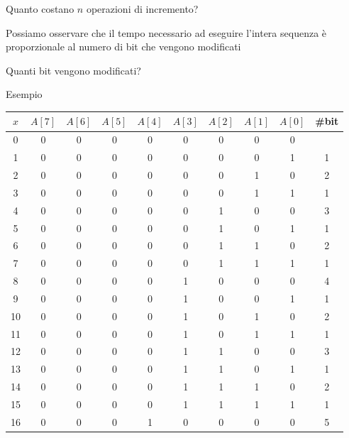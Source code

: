 \begin{frame}{Quanto costano $n$ operazioni di incremento?}

\vspace{-9pt}
\begin{myboxtitle}
\BI
\item Possiamo osservare che il tempo necessario ad eseguire l’intera sequenza è proporzionale al numero di bit che vengono modificati
\item Quanti bit vengono modificati?
\EI
\end{myboxtitle}

\end{frame}

\begin{frame}{Esempio}
	
\vspace{-6pt}
\small
\begin{tabular}{ccccccccc|c}
 $x$  &  $A[7]$ & $A[6]$ & $A[5]$ & $A[4]$ & $A[3]$ & $A[2]$ & $A[1]$ & $A[0]$ & \#bit \\\hline
 0 & 0 & 0 & 0 & 0 & 0 & 0 & 0 & 0 \\
 1 & 0 & 0 & 0 & 0 & 0 & 0 & 0 & \alert{1} & 1 \\
 2 & 0 & 0 & 0 & 0 & 0 & 0 & \alert{1} & \alert{0} & 2 \\
 3 & 0 & 0 & 0 & 0 & 0 & 0 & 1 & \alert{1} & 1 \\
 4 & 0 & 0 & 0 & 0 & 0 & \alert{1} & \alert{0} & \alert{0} & 3 \\
 5 & 0 & 0 & 0 & 0 & 0 & 1 & 0 & \alert{1} & 1 \\
 6 & 0 & 0 & 0 & 0 & 0 & 1 & \alert{1} & \alert{0} & 2 \\
 7 & 0 & 0 & 0 & 0 & 0 & 1 & 1 & \alert{1} & 1 \\
 8 & 0 & 0 & 0 & 0 & \alert{1} & \alert{0} & \alert{0} & \alert{0} & 4 \\
 9 & 0 & 0 & 0 & 0 & 1 & 0 & 0 & \alert{1} & 1 \\
10 & 0 & 0 & 0 & 0 & 1 & 0 & \alert{1} & \alert{0} & 2 \\
11 & 0 & 0 & 0 & 0 & 1 & 0 & 1 & \alert{1} & 1 \\
12 & 0 & 0 & 0 & 0 & 1 & \alert{1} & \alert{0} & \alert{0} & 3 \\
13 & 0 & 0 & 0 & 0 & 1 & 1 & 0 & \alert{1} & 1 \\
14 & 0 & 0 & 0 & 0 & 1 & 1 & \alert{1} & \alert{0} & 2 \\
15 & 0 & 0 & 0 & 0 & 1 & 1 & 1 & \alert{1} & 1 \\
16 & 0 & 0 & 0 & \alert{1} & \alert{0} & \alert{0} & \alert{0} & \alert{0} & 5 \\
\end{tabular}    
    
\end{frame}	

